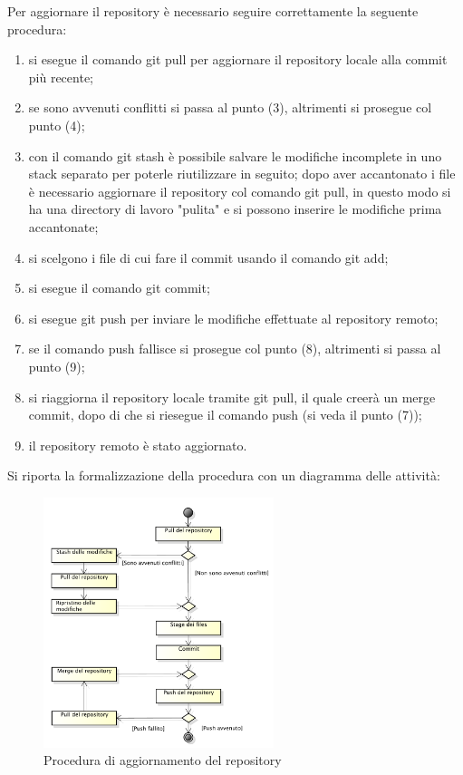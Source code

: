 					Per aggiornare il repository è necessario seguire correttamente la seguente procedura:
					\begin{enumerate}
						\item si esegue il comando git pull per aggiornare il repository locale alla commit più recente;
						\item se sono avvenuti conflitti si passa al punto (3), altrimenti si prosegue col punto (4);
						\item con il comando git stash è possibile salvare le modifiche incomplete in uno stack separato per poterle riutilizzare in seguito; dopo aver accantonato i file è necessario aggiornare il repository col comando git pull, in questo modo si ha una directory di lavoro "pulita" e si possono inserire le modifiche prima accantonate;
						\item si scelgono i file di cui fare il commit usando il comando git add;
						\item si esegue il comando git commit;
						\item si esegue git push per inviare le modifiche effettuate al repository remoto;
						\item se il comando push fallisce si prosegue col punto (8), altrimenti si passa al punto (9);
						\item si riaggiorna il repository locale tramite git pull, il quale creerà un merge commit, dopo di che si riesegue il comando push (si veda il punto (7));
						\item il repository remoto è stato aggiornato.
					\end{enumerate}
					Si riporta la formalizzazione della procedura con un diagramma delle attività:
					\begin{figure}[H]
						\centering
						\includegraphics[width=0.6\textwidth]{NormeDiProgetto/Pics/Commit}
						\caption{Procedura di aggiornamento del repository}
					\end{figure}
